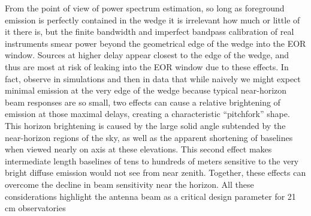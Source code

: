 \documentclass{emulateapj}
\begin{document}

From the point of view of power spectrum estimation, so long as foreground emission is perfectly contained in the wedge it is irrelevant how much or 
little of it there is, but the finite bandwidth and imperfect bandpass calibration 
of real instruments smear power beyond the geometrical edge of the wedge into the EOR 
window. Sources at higher delay appear closest to the edge of the wedge, and thus are 
most at risk of leaking into the EOR window due to these effects. In fact, 
\citet{nithya15,nithya15b} observe in simulations and then in data that while naively we might expect minimal emission 
at the very edge of the wedge because typical near-horizon beam responses are so small, 
two effects can cause a relative brightening of emission at those maximal delays, creating a characteristic ``pitchfork'' shape. This horizon 
brightening is caused by the large solid angle subtended by the near-horizon regions of the 
sky, as well as the apparent shortening of baselines when viewed nearly on axis at these elevations. 
This second effect makes intermediate length baselines of tens to hundreds of meters sensitive to the very bright diffuse 
emission would not see from near zenith. Together, these effects can overcome the decline in beam sensitivity near the horizon. 
All these considerations highlight the antenna beam as a critical design parameter for 
21\,cm observatories
\end{document}
